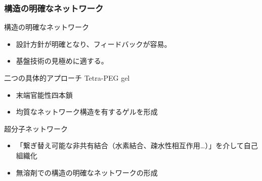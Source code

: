 \documentclass[unicode,12pt]{beamer}%
\begin{document}




    
\begin{frame}

\frametitle{構造の明確なネットワーク}

\begin{alertblock}{構造の明確なネットワーク}
\begin{itemize}
\item 設計方針が明確となり、フィードバックが容易。
\item 基盤技術の見極めに適する。
\end{itemize}

\end{alertblock}


\begin{block}{二つの具体的アプローチ}
Tetra-PEG gel
    \begin{itemize}
    \item
    末端官能性四本鎖
    \item
    均質なネットワーク構造を有するゲルを形成
    \end{itemize}

超分子ネットワーク
    \begin{itemize}
    \item
    「繋ぎ替え可能な非共有結合（水素結合、疎水性相互作用…）」を介して自己組織化
    \item
    無溶剤での構造の明確なネットワークの形成
    \end{itemize}
\end{block}
\end{frame}
    
\end{document}

